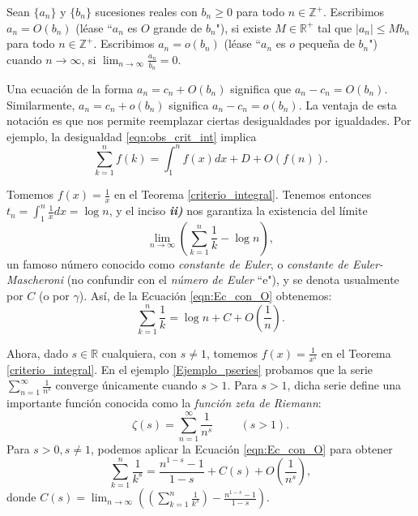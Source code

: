 \begin{definition}
  Sean $\lbrace{a_n\rbrace}$ y $\lbrace{b_n\rbrace}$ sucesiones reales con $b_n\geq 0$ para todo $n\in\mathbb{Z}^+$. Escribimos $a_n=O(b_n)$ (léase ``$a_n$ es $O$ grande de $b_n$"), si existe $M\in\mathbb{R}^+$ tal que $|a_n|\leq Mb_n$ para todo $n\in\mathbb{Z}^+$. Escribimos $a_n=o(b_n)$ (léase ``$a_n$ es $o$ pequeña de $b_n$") cuando $n\to\infty$, si $\lim_{n\to\infty}\frac{a_n}{b_n}=0$.
\end{definition}
\begin{remark}
  Una ecuación de la forma $a_n=c_n+O(b_n)$ significa que $a_n-c_n=O(b_n)$. Similarmente, $a_n=c_n+o(b_n)$ significa $a_n-c_n=o(b_n)$. La ventaja de esta notación es que nos permite reemplazar ciertas desigualdades por igualdades. Por ejemplo, la desigualdad \ref{eqn:obs_crit_int} implica
  \begin{equation}
  \label{eqn:Ec_con_O}  
    \sum_{k=1}^{n}f(k)=\int_1^{n}f(x)dx+D+O(f(n)).
  \end{equation}
\end{remark}
\begin{example}
  Tomemos $f(x)=\frac{1}{x}$ en el Teorema \ref{criterio_integral}. Tenemos entonces $t_n=\int_{1}^{n}\frac{1}{x}dx=\log n$, y el inciso \textit{\textbf{ii)}} nos garantiza la existencia del límite
  \begin{equation*} 
    \lim_{n\to\infty}\left(\sum_{k=1}^n\frac{1}{k}-\log n\right),
  \end{equation*} 
  un famoso número conocido como \textit{constante de Euler}, o \textit{constante de Euler-Mascheroni} (no confundir con el \textit{número de Euler} ``e"), y se denota usualmente por $C$ (o por $\gamma$). Así, de la Ecuación \ref{eqn:Ec_con_O} obtenemos:
  \begin{equation*}
    \sum_{k=1}^{n}\frac{1}{k}=\log n+C+O\left(\frac{1}{n}\right).
  \end{equation*}
\end{example}
\begin{example}
  Ahora, dado $s\in\mathbb{R}$ cualquiera, con $s\neq 1$, tomemos $f(x)=\frac{1}{x^s}$ en el Teorema \ref{criterio_integral}. En el ejemplo \ref{Ejemplo_pseries} probamos que la serie $\sum_{n=1}^{\infty}\frac{1}{n^s}$ converge únicamente cuando $s>1$. Para $s>1$, dicha serie define una importante función conocida como la \textit{función zeta de Riemann}:
  \begin{equation*}
    \zeta(s)=\sum_{n=1}^{\infty}\frac{1}{n^s}\hspace{1cm}(s>1).
  \end{equation*}
  Para $s>0, s\neq 1$, podemos aplicar la Ecuación \ref{eqn:Ec_con_O} para obtener
  \begin{equation*}
    \sum_{k=1}^{n}\frac{1}{k^s}=\frac{n^{1-s}-1}{1-s}+C(s)+O\left(\frac{1}{n^s}\right),
  \end{equation*}
  donde $C(s)=\lim_{n\to\infty}\left(\left(\sum_{k=1}^{n}\frac{1}{k^s}\right)-\frac{n^{1-s}-1}{1-s}\right)$.
\end{example}

